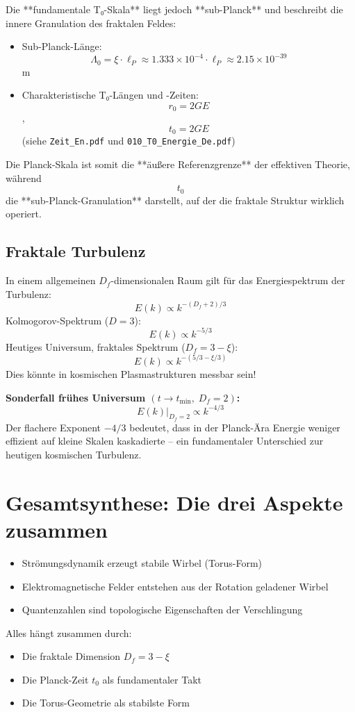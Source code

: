 	Die **fundamentale T₀-Skala** liegt jedoch **sub-Planck** und beschreibt die innere Granulation des fraktalen Feldes:
	\begin{itemize}
		\item Sub-Planck-Länge: $$   \Lambda_0 = \xi \cdot \ell_P \approx 1.333 \times 10^{-4} \cdot \ell_P \approx 2.15 \times 10^{-39}   $$ m
		\item Charakteristische T₀-Längen und -Zeiten: $$   r_0 = 2GE   $$, $$   t_0 = 2GE   $$ (siehe \texttt{Zeit\_En.pdf} und \texttt{010\_T0\_Energie\_De.pdf})
	\end{itemize}
	
	Die Planck-Skala ist somit die **äußere Referenzgrenze** der effektiven Theorie, während $$   t_0   $$ die **sub-Planck-Granulation** darstellt, auf der die fraktale Struktur wirklich operiert.
	
	\subsection{Fraktale Turbulenz}
	In einem allgemeinen \(D_f\)-dimensionalen Raum gilt für das Energiespektrum der Turbulenz:
	\[
	E(k) \propto k^{-(D_f + 2)/3}
	\]
	Kolmogorov-Spektrum (\( D = 3 \)):
	\[
	E(k) \propto k^{-5/3}
	\]
	Heutiges Universum, fraktales Spektrum (\( D_f = 3 - \xi \)):
	\[
	E(k) \propto k^{-(5/3 - \xi/3)}
	\]
	Dies könnte in kosmischen Plasmastrukturen messbar sein!

	\textbf{Sonderfall frühes Universum \((t \to t_{\min},\; D_f = 2)\):}
	\[
	E(k)\big|_{D_f=2} \propto k^{-4/3}
	\]
	Der flachere Exponent \(-4/3\) bedeutet, dass in der Planck-Ära Energie weniger effizient auf kleine Skalen kaskadierte – ein fundamentaler Unterschied zur heutigen kosmischen Turbulenz.
	
	\section{Gesamtsynthese: Die drei Aspekte zusammen}
	\begin{itemize}
		\item Strömungsdynamik erzeugt stabile Wirbel (Torus-Form)
		\item Elektromagnetische Felder entstehen aus der Rotation geladener Wirbel
		\item Quantenzahlen sind topologische Eigenschaften der Verschlingung
	\end{itemize}
	
	Alles hängt zusammen durch:
	\begin{itemize}
		\item Die fraktale Dimension \( D_f = 3 - \xi \)
		\item Die Planck-Zeit \( t_0 \) als fundamentaler Takt
		\item Die Torus-Geometrie als stabilste Form
	\end{itemize}
